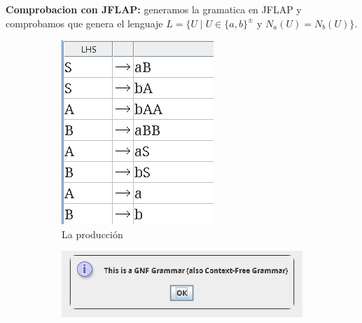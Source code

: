 \documentclass{article}
\begin{document}
           
            \newpage
            \textbf{Comprobacion con JFLAP: }
            generamos la gramatica en JFLAP y comprobamos que genera el lenguaje $L = \{ U \mid U \in \{a, b\}^{\pm} \text{ y } N_a(U) = N_b(U) \}$.
            \begin{figure}[h] 
            \centering
                \centering
                \begin{subfigure}[b]{0.35\textwidth}
                    \centering
                    \includegraphics[width=\textwidth]{./Imagenes/image1.png}
                    \caption{La producción}
                    \label{fig:label1}
                \end{subfigure}
                \hfill
                \begin{subfigure}[b]{0.55\textwidth}
                    \centering
                    \includegraphics[width=\textwidth]{./Imagenes/image2.png}

\end{subfigure}
\end{figure}
\end{document}
